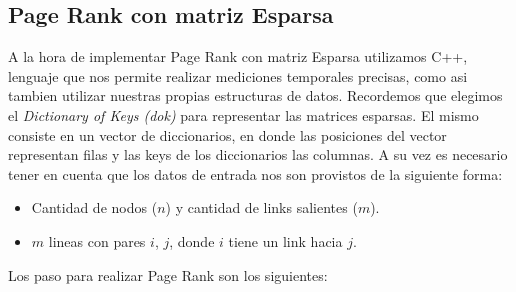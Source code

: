 \subsection{Page Rank con matriz Esparsa}
A la hora de implementar Page Rank con matriz Esparsa utilizamos \textsc{C++}, lenguaje que nos permite realizar mediciones temporales precisas, como asi tambien utilizar nuestras propias estructuras de datos.
Recordemos que elegimos el \textit{Dictionary of Keys (dok)} para representar las matrices esparsas. El mismo consiste en un vector de diccionarios, en donde las posiciones del vector representan filas y las keys de los diccionarios las columnas.
A su vez es necesario tener en cuenta que los datos de entrada nos son provistos de la siguiente forma:
\begin{itemize}
	\item Cantidad de nodos ($n$) y cantidad de links salientes ($m$).
	\item $m$ lineas con pares $i$, $j$, donde $i$ tiene un link hacia $j$.
\end{itemize}
Los paso para realizar Page Rank son los siguientes:

